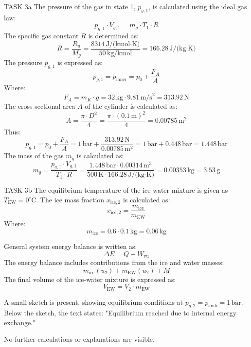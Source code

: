 TASK 3a  
The pressure of the gas in state 1, \( p_{g,1} \), is calculated using the ideal gas law:  
\[
p_{g,1} \cdot V_{g,1} = m_g \cdot T_1 \cdot R
\]  
The specific gas constant \( R \) is determined as:  
\[
R = \frac{R_u}{M_g} = \frac{8314 \, \text{J/(kmol·K)}}{50 \, \text{kg/kmol}} = 166.28 \, \text{J/(kg·K)}
\]  
The pressure \( p_{g,1} \) is expressed as:  
\[
p_{g,1} = p_{\text{inner}} = p_0 + \frac{F_A}{A}
\]  
Where:  
\[
F_A = m_K \cdot g = 32 \, \text{kg} \cdot 9.81 \, \text{m/s}^2 = 313.92 \, \text{N}
\]  
The cross-sectional area \( A \) of the cylinder is calculated as:  
\[
A = \frac{\pi \cdot D^2}{4} = \frac{\pi \cdot (0.1 \, \text{m})^2}{4} = 0.00785 \, \text{m}^2
\]  
Thus:  
\[
p_{g,1} = p_0 + \frac{F_A}{A} = 1 \, \text{bar} + \frac{313.92 \, \text{N}}{0.00785 \, \text{m}^2} = 1 \, \text{bar} + 0.448 \, \text{bar} = 1.448 \, \text{bar}
\]  
The mass of the gas \( m_g \) is calculated as:  
\[
m_g = \frac{p_{g,1} \cdot V_{g,1}}{T_1 \cdot R} = \frac{1.448 \, \text{bar} \cdot 0.00314 \, \text{m}^3}{500 \, \text{K} \cdot 166.28 \, \text{J/(kg·K)}} = 0.00353 \, \text{kg} = 3.53 \, \text{g}
\]  

TASK 3b  
The equilibrium temperature of the ice-water mixture is given as \( T_{\text{EW}} = 0^\circ\text{C} \). The ice mass fraction \( x_{\text{ice},2} \) is calculated as:  
\[
x_{\text{ice},2} = \frac{m_{\text{ice}}}{m_{\text{EW}}}
\]  
Where:  
\[
m_{\text{ice}} = 0.6 \cdot 0.1 \, \text{kg} = 0.06 \, \text{kg}
\]  

General system energy balance is written as:  
\[
\Delta E = Q - W_{\text{vu}}
\]  
The energy balance includes contributions from the ice and water masses:  
\[
m_{\text{ice}}(u_2) + m_{\text{EW}}(u_2) + M
\]  
The final volume of the ice-water mixture is expressed as:  
\[
V_{\text{EW}} = V_2 \cdot m_{\text{EW}}
\]  

A small sketch is present, showing equilibrium conditions at \( p_{g,2} = p_{\text{amb}} = 1 \, \text{bar} \). Below the sketch, the text states:  
"Equilibrium reached due to internal energy exchange."  

No further calculations or explanations are visible.